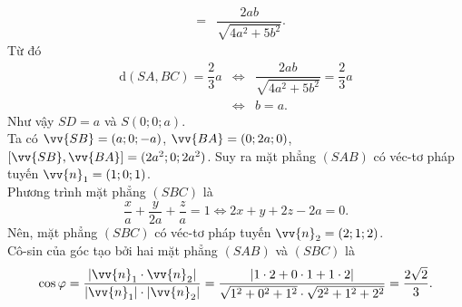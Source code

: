 \documentclass[12pt,a4paper,oneside]{book}
\def\overrightarrow{\vv}
\begin{document}
\begin{ex}
{\begin{eqnarray*}
			&=&\dfrac{2ab}{\sqrt{4a^2+5b^2}}.
		\end{eqnarray*}
		Từ đó 
		\begin{eqnarray*}
			\mathrm{d}(SA,BC)=\dfrac{2}{3}a &\Leftrightarrow & \dfrac{2ab}{\sqrt{4a^2+5b^2}}=\dfrac{2}{3}a\\
			&\Leftrightarrow & b=a.
		\end{eqnarray*}	
		Như vậy $SD=a$ và $S(0;0;a)$.\\
		Ta có $\overrightarrow{SB}=(a;0;-a)$, $\overrightarrow{BA}=(0;2a;0)$, $\left[\overrightarrow{SB}, \overrightarrow{BA}\right]=(2a^2;0;2a^2)$. Suy ra mặt phẳng $(SAB)$ có véc-tơ pháp tuyến $\overrightarrow{n}_1=(1;0;1)$.\\
		Phương trình mặt phẳng $(SBC)$ là
		$$\dfrac{x}{a}+\dfrac{y}{2a}+\dfrac{z}{a}=1\Leftrightarrow 2x+y+2z-2a=0.$$
		Nên, mặt phẳng $(SBC)$ có véc-tơ pháp tuyến $\overrightarrow{n}_2=(2;1;2)$.\\
		Cô-sin của góc tạo bởi hai mặt phẳng $(SAB)$ và $(SBC)$ là
		$$\cos \varphi = \dfrac{\left|\overrightarrow{n}_1\cdot \overrightarrow{n}_2 \right|}{\left|\overrightarrow{n}_1 \right|\cdot \left| \overrightarrow{n}_2 \right|}=\dfrac{\left|1\cdot 2+0\cdot 1+1\cdot 2\right|}{\sqrt{1^2+0^2+1^2}\cdot \sqrt{2^2+1^2+2^2}}=\dfrac{2\sqrt{2}}{3}.$$
	}
\end{ex}
\end{document}
